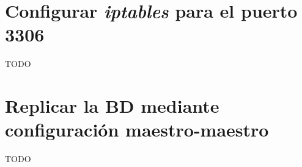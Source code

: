 \documentclass{article}
\begin{document}
\section{Configurar \emph{iptables} para el puerto 3306}

TODO

\section{Replicar la BD mediante configuración maestro-maestro}

TODO
\end{document}

